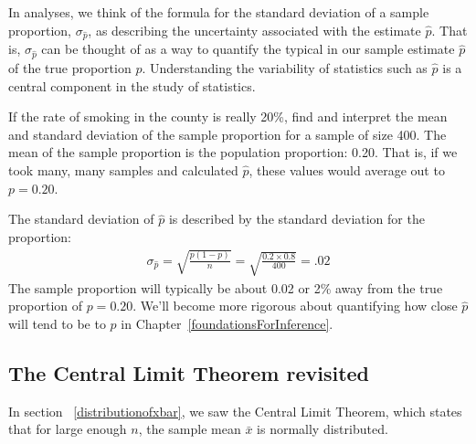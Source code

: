 
In analyses, we think of the formula for the standard deviation of a sample proportion, $\sigma_{\hat{p}}$, as describing the uncertainty associated with the estimate $\hat{p}$. That is, $\sigma_{\hat{p}}$ can be thought of as a way to quantify the typical  in our sample estimate $\hat{p}$ of the true proportion $p$. Understanding the variability of statistics such as $\hat{p}$ is a central component in the study of statistics.


\begin{example}{If the rate of smoking in the county is really 20\%, find and interpret the mean and standard deviation of the sample proportion for a sample of size 400.}
The mean of the sample proportion is the population proportion: 0.20. That is, if we took many, many samples and calculated $\hat{p}$, these values would average out to $p = 0.20$.

The standard deviation of $\hat{p}$ is described by the standard deviation for the proportion:
\begin{align*}
\sigma_{\hat{p}}
	= \sqrt{\frac{p(1-p)}{n}}
	= \sqrt{\frac{0.2 \times 0.8}{400}}
	= .02
\end{align*}
The sample proportion will typically be about 0.02 or 2\% away from the true proportion of $p = 0.20$. We'll become more rigorous about quantifying how close $\hat{p}$ will tend to be to $p$ in Chapter~\ref{foundationsForInference}.
\end{example}

\subsection{The Central Limit Theorem revisited}

In section ~\ref{distributionofxbar}, we saw the Central Limit Theorem, which states that for large enough $n$, the sample mean $\bar{x}$ is normally distributed.

